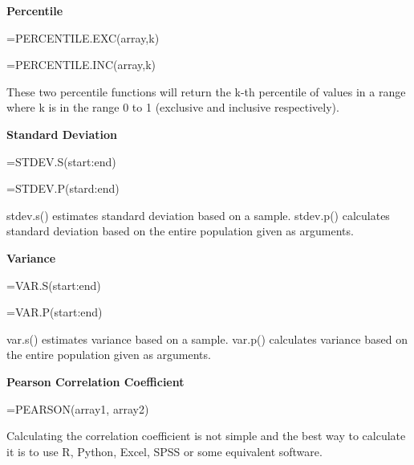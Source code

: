 \documentclass[
]{book}
\begin{document}
\textbf{Percentile}

=PERCENTILE.EXC(array,k)

=PERCENTILE.INC(array,k)

These two percentile functions will return the k-th percentile of values in a range where k is in the range 0 to 1 (exclusive and inclusive respectively).

\textbf{Standard Deviation}

=STDEV.S(start:end)

=STDEV.P(stard:end)

stdev.s() estimates standard deviation based on a sample. stdev.p() calculates standard deviation based on the entire population given as arguments.

\textbf{Variance}

=VAR.S(start:end)

=VAR.P(start:end)

var.s() estimates variance based on a sample. var.p() calculates variance based on the entire population given as arguments.

\textbf{Pearson Correlation Coefficient}

=PEARSON(array1, array2)

Calculating the correlation coefficient is not simple and the best way to calculate it is to use R, Python, Excel, SPSS or some equivalent software.

  
\end{document}
